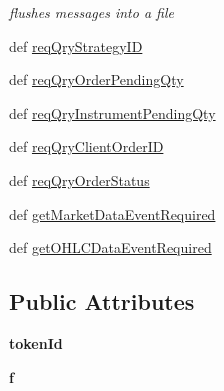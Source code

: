 \begin{DoxyCompactItemize}
\begin{DoxyCompactList}\small\item\em flushes messages into a file \end{DoxyCompactList}\item 
def \hyperlink{classmuTradePyBase_1_1CustomStrategy_a783fc19776f20c4bbf45bcf1384301cf}{req\-Qry\-Strategy\-I\-D}
\item 
def \hyperlink{classmuTradePyBase_1_1CustomStrategy_a10b0158e6ee017a217f5ca781665ebf5}{req\-Qry\-Order\-Pending\-Qty}
\item 
def \hyperlink{classmuTradePyBase_1_1CustomStrategy_a406bd4255541760e42558b6d9e3ea970}{req\-Qry\-Instrument\-Pending\-Qty}
\item 
def \hyperlink{classmuTradePyBase_1_1CustomStrategy_a85b752c1b42ee6aa812486e373ae6aa7}{req\-Qry\-Client\-Order\-I\-D}
\item 
def \hyperlink{classmuTradePyBase_1_1CustomStrategy_abc3e6aa17fa14d4796ad0d69e54d0847}{req\-Qry\-Order\-Status}
\item 
def \hyperlink{classmuTradePyBase_1_1CustomStrategy_a1a44069e7158cf94df350fd83bcfcbfe}{get\-Market\-Data\-Event\-Required}
\item 
def \hyperlink{classmuTradePyBase_1_1CustomStrategy_aac6f961846182e3b427d1cb683a62777}{get\-O\-H\-L\-C\-Data\-Event\-Required}
\end{DoxyCompactItemize}
\subsection*{Public Attributes}
\begin{DoxyCompactItemize}
\item 
\hypertarget{classmuTradePyBase_1_1CustomStrategy_ae242144123c146f95fbb938e3ba7963f}{{\bfseries token\-Id}}\label{classmuTradePyBase_1_1CustomStrategy_ae242144123c146f95fbb938e3ba7963f}

\item 
\hypertarget{classmuTradePyBase_1_1CustomStrategy_a1eccd957cad582b48154287d2110cdc0}{{\bfseries f}}\label{classmuTradePyBase_1_1CustomStrategy_a1eccd957cad582b48154287d2110cdc0}

\end{DoxyCompactItemize}


